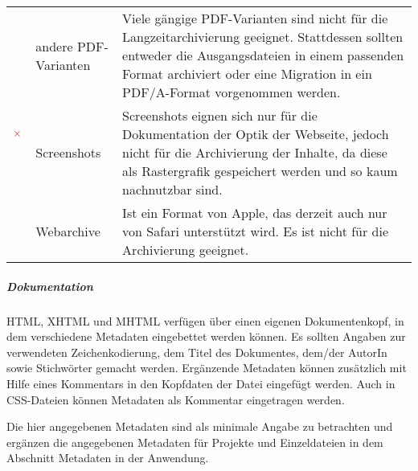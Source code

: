 \begin{center}
\begin{longtable}{l L{0.2\textwidth} p{0.6\textwidth}}
		& andere PDF-Varianten & Viele gängige PDF-Varianten sind nicht für die Langzeitarchivierung geeignet. Stattdessen sollten entweder die Ausgangsdateien in einem passenden Format archiviert oder eine Migration in ein PDF/A-Format vorgenommen werden.\\
			& Screenshots & Screenshots eignen sich nur für die Dokumentation der Optik der Webseite, jedoch nicht für die Archivierung der Inhalte, da diese als Rastergrafik gespeichert werden und so kaum nachnutzbar sind. \\
		  & Webarchive & Ist ein Format von Apple, das derzeit auch nur von Safari unterstützt wird. Es ist nicht für die Archivierung geeignet.\\ 
 		\bottomrule    
	\end{longtable}
\end{center}


\subparagraph{Dokumentation} 
HTML, XHTML und MHTML verfügen über einen eigenen Dokumentenkopf, in dem verschiedene Metadaten eingebettet werden können. Es sollten Angaben zur verwendeten Zeichenkodierung, dem Titel des Dokumentes, dem/der AutorIn sowie Stichwörter gemacht werden. Ergänzende Metadaten können zusätzlich mit Hilfe eines Kommentars in den Kopfdaten der Datei eingefügt werden. Auch in CSS-Dateien können Metadaten als Kommentar eingetragen werden.
 
Die hier angegebenen Metadaten sind als minimale Angabe zu betrachten und ergänzen die angegebenen Metadaten für Projekte und Einzeldateien in dem Abschnitt Metadaten in der Anwendung.

